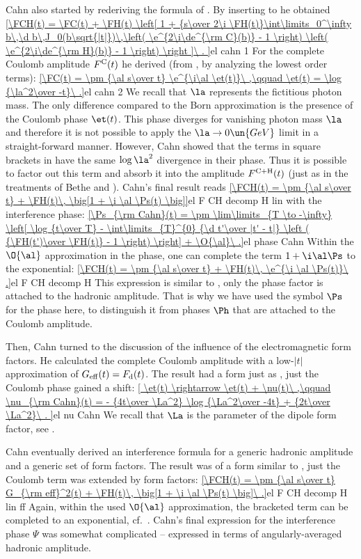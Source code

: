 Cahn  also started by rederiving the formula of \WY. By inserting  to  he obtained
\eqref{\FCH(t) = \FC(t)
+ \FH(t) \left[ 1 +
{s\over 2\i \FH(t)}\int\limits_0^\infty b\,\d b\,J_0(b\sqrt{|t|})\,\left( \e^{2\i\de^{\rm C}(b)} - 1 \right) \left( \e^{2\i\de^{\rm H}(b)} - 1 \right)
\right ]\ .
}{el cahn 1}
For the complete Coulomb amplitude $F^{\rm C}(t)$ he derived (from , by analyzing the lowest order terms):
\eqref{\FC(t) = \pm {\al s\over t} \e^{\i\al \et(t)}\ ,\qquad \et(t) = \log {\la^2\over -t}\ .}{el cahn 2}
We recall that $\la$ represents the fictitious photon mass. The only difference compared to the Born approximation  is the presence of the Coulomb phase $\et(t)$. This phase diverges for vanishing photon mass $\la$ and therefore it is not possible to apply the $\la\to 0\un{GeV}$ limit in a straight-forward manner. However, Cahn showed that the terms in square brackets in  have the same $\log\la^2$ divergence in their phase. Thus it is possible to factor out this term and absorb it into the amplitude $F^{\rm C+H}(t)$ (just as in the treatments of Bethe and \WY). Cahn's final result reads
\eqref{\FCH(t) = \pm {\al s\over t} + \FH(t)\, \big[1 + \i \al \Ps(t) \big]}{el F CH decomp H lin}
with the interference phase:
\eqref{\Ps_{\rm Cahn}(t) = \pm \lim\limits_{T \to -\infty} \left[ \log {t\over T} - \int\limits_{T}^{0} {\d t'\over |t' - t|} \left ( {\FH(t')\over \FH(t)} - 1 \right) \right] + \O{\al}\ .}{el phase Cahn}
Within the $\O{\al}$ approximation in the phase, one can complete the term $1+\i\al\Ps$ to the exponential:
\eqref{\FCH(t) = \pm {\al s\over t} + \FH(t)\, \e^{\i \al \Ps(t)}\ .}{el F CH decomp H}
This expression is similar to , only the phase factor is attached to the hadronic amplitude. That is why we have used the symbol $\Ps$ for the phase here, to distinguish it from phases $\Ph$ that are attached to the Coulomb amplitude.

Then, Cahn turned to the discussion of the influence of the electromagnetic form factors. He calculated the complete Coulomb amplitude with a low-$|t|$ approximation of $G_{\rm eff}(t) = F_{\rm d}(t)$. The result had a form just as , just the Coulomb phase gained a shift:
\eqref{
	\et(t) \rightarrow \et(t) + \nu(t)\ ,\qquad
	\nu_{\rm Cahn}(t) = - {4t\over \La^2} \log {\La^2\over -4t} + {2t\over \La^2}\ .
}{el nu Cahn}
We recall that $\La$ is the parameter of the dipole form factor, see .

Cahn eventually derived an interference formula for a generic hadronic amplitude and a generic set of form factors. The result was of a form similar to , just the Coulomb term was extended by form factors:
\eqref{\FCH(t) = \pm {\al s\over t} G_{\rm eff}^2(t) + \FH(t)\, \big[1 + \i \al \Ps(t) \big]\ .}{el F CH decomp H lin ff}
Again, within the used $\O{\al}$ approximation, the bracketed term can be completed to an exponential, cf.~. Cahn's final expression for the interference phase $\Psi$ was somewhat complicated -- expressed in terms of angularly-averaged hadronic amplitude.

